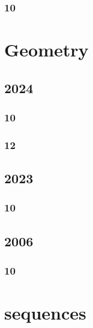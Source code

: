 \documentclass[11pt]{book}
\begin{document}
\subsection{10}

%

\chapter{Geometry}
\section{2024}
\subsection{10}

\subsection{12}

\section{2023}
\subsection{10}

\section{2006}
\subsection{10}

%

\chapter{sequences}
\end{document}
